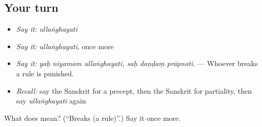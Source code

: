 \subsection*{Your turn}
\begin{itemize}
\raggedright
  \item \emph{Say it:} \emph{ullaṅghayati}
  \item \emph{Say it:} \emph{ullaṅghayati}, once more
  \item \emph{Say it:} \emph{yaḥ niyamam ullaṅghayati, saḥ daṇḍaṃ prāpnoti.} — Whoever breaks a rule is punished.
  \item \emph{Recall:} say the Sanskrit for a precept, then the Sanskrit for partiality, then say \emph{ullaṅghayati} again
\end{itemize}

\begin{tcolorbox}[breakable,colback=teal!4,colframe=teal!35!black,title={Before you move on}]
What does  mean? (\textquotedblleft{}Breaks (a rule)\textquotedblright{}.) Say it once more.
\end{tcolorbox}
